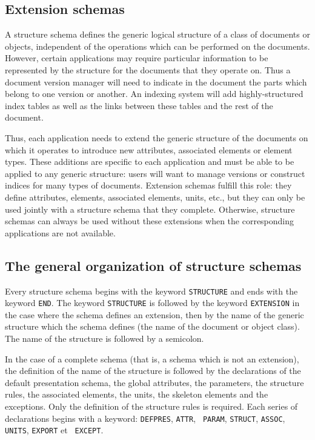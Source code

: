 \subsection{Extension schemas}
\label{schext}

A structure schema defines the generic logical structure of a class of
documents or objects, independent of the operations which can be
performed on the documents.  However, certain applications may require
particular information to be represented by the structure for the
documents that they operate on.  Thus a document version manager will need to
indicate in the document the parts which belong to one version or
another.  An indexing system will add highly-structured index tables
as well as the links between these tables and the rest of the
document.

Thus, each application needs to extend the generic structure of the
documents on which it operates to introduce new attributes, associated
elements or element types.  These additions are specific to each
application and must be able to be applied to any generic structure:
users will want to manage versions or construct indices for many types
of documents.  Extension schemas fulfill this role: they define
attributes, elements, associated elements, units, etc., but they can
only be used jointly with a structure schema that they complete.
Otherwise, structure schemas can always be used without these
extensions when the corresponding applications are not available.

\subsection{The general organization of structure schemas}

Every structure schema begins with the keyword {\tt STRUCTURE} and
ends with the keyword {\tt END}.  The keyword {\tt STRUCTURE} is
followed by the keyword {\tt EX\-TEN\-SION} in the case where the schema
defines an extension, then by the name of the generic structure which
the schema defines (the name of the document or object class).  The
name of the structure is followed by a semicolon.

In the case of a complete schema (that is, a schema which is not an
extension), the definition of the name of the structure is followed by
the declarations of the default presentation schema, the global
attributes, the parameters, the structure rules, the associated
elements, the units, the skeleton elements and the exceptions.  Only
the definition of the structure rules is required.  Each series of
declarations begins with a keyword: {\tt DEFPRES}, {\tt ATTR}, {\tt
PARAM}, {\tt STRUCT}, {\tt ASSOC}, {\tt UNITS}, {\tt EXPORT} et {\tt
EXCEPT}.


